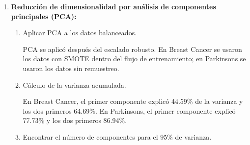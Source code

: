 \documentclass{article}
\begin{document}
\begin{enumerate}
\begin{enumerate}
      Se utilizó \texttt{RobustScaler} en ambos conjuntos, ya que este escalador usa mediana y rango intercuartílico, lo cual reduce la influencia de valores extremos frente a \texttt{StandardScaler}.

      \item Separación en 70\% entrenamiento y 30\% prueba.

      La división fue estratificada. Breast Cancer quedó con 398 registros de entrenamiento y 171 de prueba. En entrenamiento tuvo 250 casos \texttt{B} y 148 \texttt{M}. Parkinsons quedó con 4112 registros de entrenamiento y 1763 de prueba. En entrenamiento tuvo 1373 casos \texttt{low}, 1370 \texttt{high} y 1369 \texttt{medium}.

      \item Manejo del desbalance de clases sobre el conjunto de entrenamiento (por ejemplo SMOTE, ADASYN o Sobremuestreo aleatorio).

      Para Breast Cancer se aplicó SMOTE porque la razón minoría/mayoría fue 0.592; la clase maligna pasó de 148 a 250 muestras en entrenamiento. En Parkinsons no se aplicó SMOTE porque las clases quedaron prácticamente balanceadas, con razón minoría/mayoría de 0.997.

      \item Visualización de la distribución.

      La distribución posterior al manejo de desbalance se verificó para confirmar el balance aplicado en Breast Cancer y la conservación de clases en Parkinsons.
    \end{enumerate}

  \item \textbf{Reducción de dimensionalidad por análisis de componentes principales (PCA):}
    \begin{enumerate}
        \item Aplicar PCA a los datos balanceados.

        PCA se aplicó después del escalado robusto. En Breast Cancer se usaron los datos con SMOTE dentro del flujo de entrenamiento; en Parkinsons se usaron los datos sin remuestreo.

        \item Cálculo de la varianza acumulada.

        En Breast Cancer, el primer componente explicó 44.59\% de la varianza y los dos primeros 64.69\%. En Parkinsons, el primer componente explicó 77.73\% y los dos primeros 86.94\%.

        \item Encontrar el número de componentes para el 95\% de varianza.


\end{enumerate}
\end{enumerate}
\end{document}
